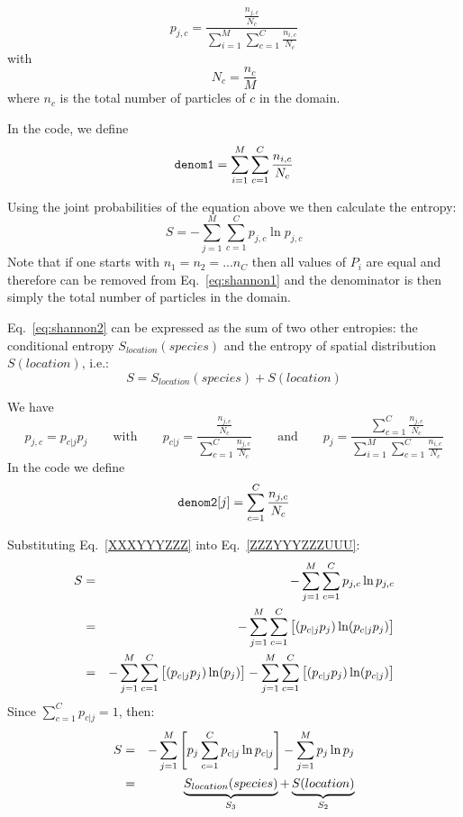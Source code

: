 \begin{equation}
p_{j,c} = \frac{\frac{n_{j,c}}{N_c}}{\sum\limits_{i=1}^M \sum\limits_{c=1}^C \frac{n_{i,c}}{N_c}}
\label{eq:shannon1}
\end{equation}
with 
\[
N_c = \frac{n_c}{M}
\]
where $n_c$ is the total number of particles of $c$ in the domain.

In the code, we define
\[
{\tt denom1}=\sum\limits_{i=1}^M \sum\limits_{c=1}^C \frac{n_{i,c}}{N_c}
\]

Using the joint probabilities of the equation above we then calculate the entropy:
\begin{equation}
S= -\sum_{j=1}^M \sum_{c=1}^C p_{j,c} \ln p_{j,c}
\label{eq:shannon2}
\end{equation}
Note that if one starts with $n_1=n_2=...n_C$ then all values of $P_i$ are equal and 
therefore can be removed from Eq.~\eqref{eq:shannon1} and the denominator is then simply 
the total number of particles in the domain.

Eq.~\eqref{eq:shannon2} can be expressed as the sum of two other entropies:
the conditional entropy $S_{location}(species)$ and the entropy of spatial 
distribution $S(location)$, i.e.:
\[
S=S_{location}(species) + S(location)
\]

We have 
\[
p_{j,c} = p_{c|j}p_j
\qquad
\text{with}
\qquad
p_{c|j}=\frac{\frac{n_{j,c}}{N_c}}{\sum\limits_{c=1}^C \frac{n_{j,c}}{N_c}}
\qquad
\text{and}
\qquad
p_j=\frac{\sum\limits_{c=1}^C \frac{n_{j,c}}{N_c}}{\sum\limits_{i=1}^M \sum\limits_{c=1}^C \frac{n_{i,c}}{N_c}} 
\]
In the code we define 
\[
{\tt denom2}[j]=\sum\limits_{c=1}^C \frac{n_{j,c}}{N_c}
\]


Substituting Eq.~\eqref{XXXYYYZZZ} into Eq.~\eqref{ZZZYYYZZZUUU}:
\begin{eqnarray}
S
&=& -\sum_{j=1}^M \sum_{c=1}^C p_{j,c} \ln p_{j,c} \nonumber\\
&=& -\sum_{j=1}^M \sum_{c=1}^C \left[ (p_{c|j}p_j) \ln (p_{c|j}p_j) \right] \nonumber\\
&=& -\sum_{j=1}^M \sum_{c=1}^C \left[ (p_{c|j}p_j) \ln (p_j) \right] 
    -\sum_{j=1}^M \sum_{c=1}^C \left[ (p_{c|j}p_j) \ln (p_{c|j}) \right] \nonumber\\
\end{eqnarray}
Since $\sum\limits_{c=1}^C p_{c|j}=1$, then:
\begin{eqnarray}
S
&=&-\sum_{j=1}^M \left[
p_j \sum_{c=1}^C p_{c|j} \ln p_{c|j}
\right]
-
\sum_{j=1}^M p_j \ln p_j \nonumber\\
&=& 
\underbrace{S_{location}(species)}_{S_3} + \underbrace{S(location)}_{S_2}
\end{eqnarray}

